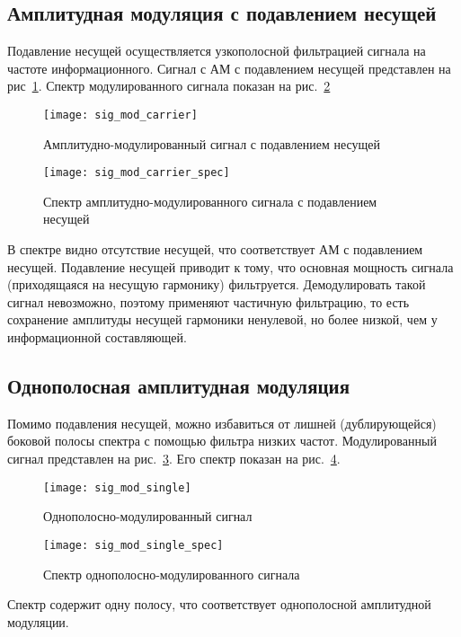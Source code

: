 \subsection{Амплитудная модуляция с подавлением несущей}
Подавление несущей осуществляется узкополосной фильтрацией сигнала на частоте информационного.
 Сигнал с АМ с подавлением несущей представлен на рис~\ref{pic:signal_mod_carrier}.
 Спектр модулированного сигнала показан на рис.~\ref{pic:signal_mod_carrier_spec}
\begin{figure}[H]
	\begin{center}
		\texttt{[image: sig\_mod\_carrier]}
		\caption{Амплитудно-модулированный сигнал с подавлением несущей} 
		\label{pic:signal_mod_carrier} %
	\end{center}
\end{figure}
\begin{figure}[H]
	\begin{center}
		\texttt{[image: sig\_mod\_carrier\_spec]}
		\caption{Спектр амплитудно-модулированного сигнала с подавлением несущей} 
		\label{pic:signal_mod_carrier_spec} %
	\end{center}
\end{figure}
В спектре видно отсутствие несущей, что соответствует АМ с подавлением несущей.
Подавление несущей приводит к тому, что основная мощность сигнала (приходящаяся на несущую гармонику) фильтруется.
Демодулировать такой сигнал невозможно, поэтому применяют частичную фильтрацию, то есть сохранение амплитуды несущей гармоники ненулевой, но более низкой, чем у информационной составляющей.

\subsection{Однополосная амплитудная модуляция}
Помимо подавления несущей, можно избавиться от лишней (дублирующейся) боковой полосы спектра с помощью 
фильтра низких частот. Модулированный сигнал представлен на рис.~\ref{pic:signal_mod_singleband}.
Его спектр показан на рис.~\ref{pic:signal_mod_singleband_spec}.
\begin{figure}[H]
	\begin{center}
		\texttt{[image: sig\_mod\_single]}
		\caption{Однополосно-модулированный сигнал} 
		\label{pic:signal_mod_singleband} %
	\end{center}
\end{figure}
\begin{figure}[H]
	\begin{center}
		\texttt{[image: sig\_mod\_single\_spec]}
		\caption{Спектр однополосно-модулированного сигнала} 
		\label{pic:signal_mod_singleband_spec} %
	\end{center}
\end{figure}
Спектр содержит одну полосу, что соответствует однополосной амплитудной модуляции.

